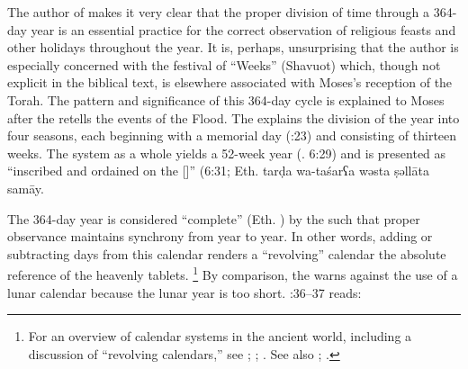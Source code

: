 The author of \jub makes it very clear that the proper division of time through a 364-day year is an essential practice for the correct observation of religious feasts and other holidays throughout the year. It is, perhaps, unsurprising that the author is especially concerned with the festival of ``Weeks'' (Shavuot) which, though not explicit in the biblical text, is elsewhere associated with Moses's reception of the Torah. The pattern and significance of this 364-day cycle is explained to Moses after the \ap retells the events of the Flood. The \ap explains the division of the year into four seasons, each beginning with a memorial day (:23) and consisting of thirteen weeks. The system as a whole yields a 52-week year (\jub. 6:29) and is presented as ``inscribed and ordained on the [\heavenlytablets]'' (6:31; Eth.
        {tarḍa wa-taśarʕa wəsta ṣəllāta samāy}.

The 364-day year is considered ``complete'' (Eth. ) by the \ap such that proper observance maintains synchrony from year to year. In other words, adding or subtracting days from this calendar renders a ``revolving'' calendar \visavis the absolute reference of the heavenly tablets.%
    \footnote{%
        For an overview of calendar systems in the ancient world, including a discussion of ``revolving calendars,'' see 
        \cite{bendov2008};
        \cite[214]{glessmer_flint-vanderkam1999};
        \cite{vanderkam1998}. See also
        \cite{baumgarten_baumgarten1977};
        \cite{baumgarten_vt1987a}.}
By comparison, the \ap warns against the use of a lunar calendar because the lunar year is too short. :36--37 reads:

